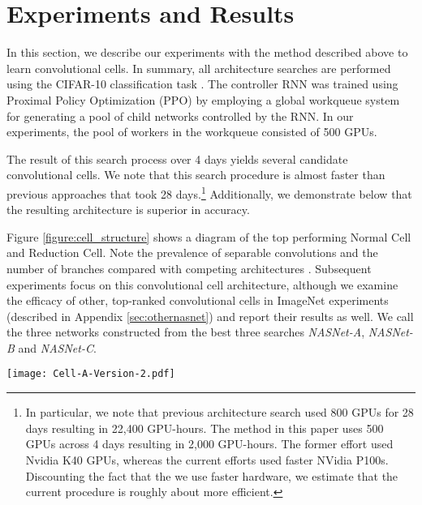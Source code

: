 \section{Experiments and Results}


In this section, we describe our experiments with the method described above to learn convolutional cells. In summary, all architecture searches are performed using the CIFAR-10 classification task \cite{krizhevsky2009learning}. The controller RNN was trained using Proximal Policy Optimization (PPO) \cite{SchulmanWDRK17} by employing a global workqueue system for generating a pool of child networks controlled by the RNN. In our experiments, the pool of workers in the workqueue consisted of 500 GPUs. 

The result of this search process over 4 days yields several candidate convolutional cells. We note that this search procedure is almost  faster than previous approaches \cite{zoph2017neural} that took 28 days.\footnote{In particular, we note that previous architecture search \cite{zoph2017neural} used 800 GPUs for 28 days resulting in 22,400 GPU-hours. The method in this paper uses 500 GPUs across 4 days resulting in 2,000 GPU-hours. The former effort used Nvidia K40 GPUs, whereas the current efforts used faster NVidia P100s. Discounting the fact that the we use faster hardware, we estimate that the current procedure is roughly about  more efficient.} Additionally, we demonstrate below that the resulting architecture is superior in accuracy.

Figure \ref{figure:cell_structure} shows a diagram of the top performing Normal Cell and Reduction Cell. Note the prevalence of separable convolutions and the number of branches compared with competing architectures \cite{simonyan2014very,szegedy2015going,he2015deep,szegedy2016rethinking,szegedy2016inception}. Subsequent experiments focus on this convolutional cell architecture, although we examine the efficacy of other, top-ranked  convolutional cells in ImageNet experiments (described in Appendix \ref{sec:othernasnet}) and report their results as well. We call the three networks constructed from the best three searches \emph{NASNet-A}, \emph{NASNet-B} and \emph{NASNet-C}.



\begin{figure*}[h!]
\begin{center}
\texttt{[image: Cell-A-Version-2.pdf]}
\caption{Architecture of the best convolutional cells (NASNet-A) with  blocks identified with CIFAR-10 . The input (white) is the hidden state from previous activations (or input image). The output (pink) is the result of a concatenation operation across all resulting branches.
Each convolutional cell is the result of  blocks.
A single block is corresponds to two primitive operations (yellow) and a combination operation (green). Note that colors correspond to operations in Figure \ref{figure:cell}. 
}
\label{figure:cell_structure}
\end{center}
\end{figure*}

